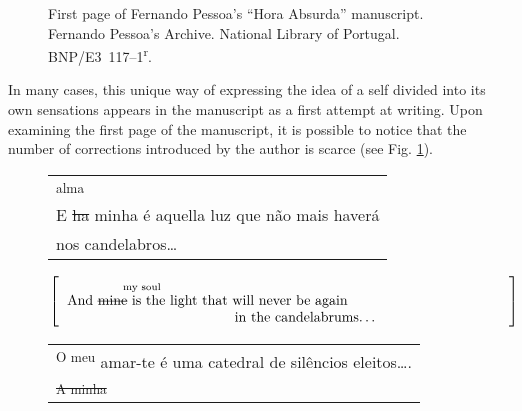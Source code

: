 \begin{paper}
\begin{figure}
    \centering
    \caption{First page of Fernando Pessoa's ``Hora Absurda'' manuscript. Fernando Pessoa's Archive. National Library of Portugal. BNP/E3~117--1\textsuperscript{r}.}
    \label{fig:defenu1}
\end{figure}

In many cases, this unique way of expressing the idea of a self divided
into its own sensations appears in the manuscript as a first attempt at
writing. Upon examining the first page of the manuscript, it is possible
to notice that the number of corrections introduced by the author is
scarce (see Fig. \ref{fig:defenu1}).

\begin{figure}[H]
    \begin{center}
    \begin{tabular}{p{}}
        \hspace{4.5em} \textsubscript{alma} \\
        E \sout{ha} minha é aquella luz que não mais haverá \\
        \hspace{13em} nos candelabros\ldots{} \\
    \end{tabular}
    \end{center}
    
    \begin{center}
    \begin{equation*}
	\left[\begin{tabular}{p{.9\textwidth}}
   		\text{\hspace{4em}\textsubscript{my soul}} \\
        \text{And \sout{mine} is the light that will never be again} \\
        \text{\hspace{12em}in the candelabrums\ldots{}} \\
	\end{tabular}\right]
    \end{equation*}
    \end{center}

\subfigure[Line 39]{
    \centering\small
    \hspace{\textwidth}
    \label{fig:defenu2a}
}
    \begin{center}
    \begin{tabular}{p{}}
        \hspace{.2em}\textsuperscript{O meu} amar-te é uma catedral de silêncios eleitos\ldots.\\
        \textsuperscript{\sout{A minha}}\\
    \end{tabular}
    \end{center}
    

\end{figure}
\end{paper}
